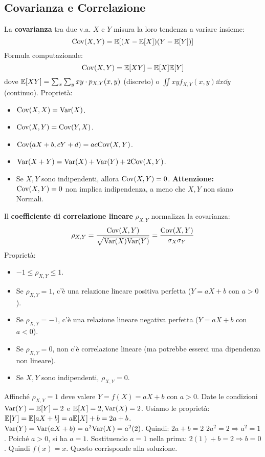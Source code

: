 \documentclass[12pt,a4paper]{article}
\begin{document}
\begin{example}
\section{Covarianza e Correlazione}
\begin{definition}[Covarianza]
La \textbf{covarianza} tra due v.a. $X$ e $Y$ misura la loro tendenza a variare insieme:
\[ \mathrm{Cov}(X,Y) = \mathbb{E}[(X-\mathbb{E}[X])(Y-\mathbb{E}[Y])] \]
Formula computazionale:
\[ \mathrm{Cov}(X,Y) = \mathbb{E}[XY] - \mathbb{E}[X]\mathbb{E}[Y] \]
dove $\mathbb{E}[XY] = \sum_x \sum_y xy \cdot p_{X,Y}(x,y)$ (discreto) o $\iint xy f_{X,Y}(x,y) \dd x \dd y$ (continuo).
Proprietà:
\begin{itemize}
    \item $\mathrm{Cov}(X,X) = \mathrm{Var}(X)$.
    \item $\mathrm{Cov}(X,Y) = \mathrm{Cov}(Y,X)$.
    \item $\mathrm{Cov}(aX+b, cY+d) = ac \mathrm{Cov}(X,Y)$.
    \item $\mathrm{Var}(X+Y) = \mathrm{Var}(X) + \mathrm{Var}(Y) + 2\mathrm{Cov}(X,Y)$.
    \item Se $X, Y$ sono indipendenti, allora $\mathrm{Cov}(X,Y) = 0$. \textbf{Attenzione:} $\mathrm{Cov}(X,Y)=0$ non implica indipendenza, a meno che $X,Y$ non siano Normali.
\end{itemize}
\end{definition}

\begin{definition}
Il \textbf{coefficiente di correlazione lineare} $\rho_{X,Y}$ normalizza la covarianza:
\[ \rho_{X,Y} = \frac{\mathrm{Cov}(X,Y)}{\sqrt{\mathrm{Var}(X)\mathrm{Var}(Y)}} = \frac{\mathrm{Cov}(X,Y)}{\sigma_X \sigma_Y} \]
Proprietà:
\begin{itemize}
    \item $-1 \le \rho_{X,Y} \le 1$.
    \item Se $\rho_{X,Y} = 1$, c'è una relazione lineare positiva perfetta ($Y=aX+b$ con $a>0$).
    \item Se $\rho_{X,Y} = -1$, c'è una relazione lineare negativa perfetta ($Y=aX+b$ con $a<0$).
    \item Se $\rho_{X,Y} = 0$, non c'è correlazione lineare (ma potrebbe esserci una dipendenza non lineare).
    \item Se $X,Y$ sono indipendenti, $\rho_{X,Y}=0$.
\end{itemize}
\end{definition}
\begin{example}
Affinché $\rho_{X,Y}=1$ deve valere $Y = f(X) = aX+b$ con $a>0$.
Date le condizioni $\mathrm{Var}(Y) = \mathbb{E}[Y]=2$ e $\mathbb{E}[X]=2, \mathrm{Var}(X)=2$.
Usiamo le proprietà:
$\mathbb{E}[Y] = \mathbb{E}[aX+b] = a\mathbb{E}[X]+b = 2a+b$.
$\mathrm{Var}(Y) = \mathrm{Var}(aX+b) = a^2\mathrm{Var}(X) = a^2(2)$.
Quindi:
$2a+b = 2$
$2a^2 = 2 \Rightarrow a^2 = 1$. Poiché $a>0$, si ha $a=1$.
Sostituendo $a=1$ nella prima: $2(1)+b=2 \Rightarrow b=0$.
Quindi $f(x) = x$. Questo corrisponde alla soluzione.
\end{example}


\end{example}
\end{document}
